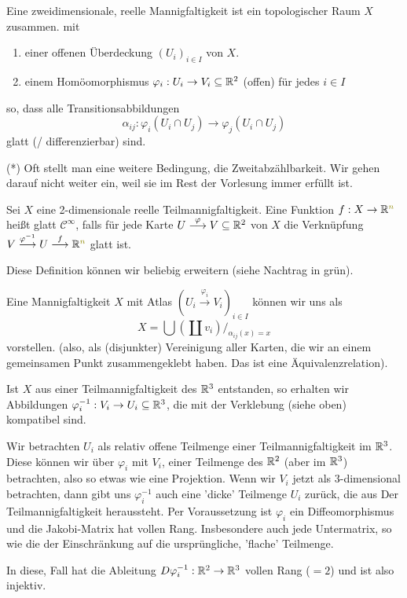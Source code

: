 \documentclass[main.tex]{subfiles}
\begin{document}
\begin{Definition}
  Eine zweidimensionale, reelle Mannigfaltigkeit ist ein topologischer Raum $X$ zusammen. mit
  \begin{enumerate}
    \item einer offenen Überdeckung $(U_i)_{i \in I}$ von $X$.
    \item einem Homöomorphismus $\varphi_i : U_i \to V_i \subseteq \mathbb{R}^2$ (offen) für jedes $i \in I$
  \end{enumerate}
  so, dass alle Transitionsabbildungen
  $$\alpha_{ij} : \varphi_i(U_i \cap U_j) \to \varphi_j(U_i \cap U_j)$$
  glatt (/ differenzierbar) sind.

  (*) Oft stellt man eine weitere Bedingung, die Zweitabzählbarkeit. Wir gehen darauf nicht weiter ein, weil sie im Rest der Vorlesung immer erfüllt ist.
\end{Definition}

\begin{Definition}
  Sei $X$ eine 2-dimensionale reelle Teilmannigfaltigkeit. Eine Funktion $f: X \to \R^{\color{olive}n}$ heißt glatt $\mathcal{C}^\infty$, falls für jede Karte $U \stackrel{\varphi}{\longrightarrow} V \subseteq \mathbb{R}^2$ von $X$ die Verknüpfung $V \stackrel{\varphi^{-1}}{\longrightarrow} U \stackrel{f}{\longrightarrow} \R^{\color{olive}n}$ glatt ist.

  Diese Definition können wir beliebig erweitern (siehe Nachtrag in grün).
\end{Definition}

Eine Mannigfaltigkeit $X$ mit Atlas $(U_i \stackrel{\varphi_i}{\longrightarrow} V_i)_{i \in I}$ können wir uns als
$$X = \bigcup \left(\coprod v_i \right) /_{\alpha_{ij}(x) = x}$$
vorstellen. (also, als (disjunkter) Vereinigung aller Karten, die wir an einem gemeinsamen Punkt zusammengeklebt haben. Das ist eine Äquivalenzrelation).

Ist $X$ aus einer Teilmannigfaltigkeit des $\mathbb{R}^3$ entstanden, so erhalten wir Abbildungen $\varphi_i^{-1}: V_i \to U_i \subseteq \mathbb{R}^3$, die mit der Verklebung (siehe oben) kompatibel sind.

\begin{Bemerkung}[(salopp)]
  Wir betrachten $U_i$ als relativ offene Teilmenge einer Teilmannigfaltigkeit im $\mathbb{R}^3$. Diese können wir über $\varphi_i$ mit $V_i$, einer Teilmenge des $\mathbb{R}^2$ (aber im $\mathbb{R}^3$) betrachten, also so etwas wie eine Projektion. Wenn wir $V_i$ jetzt als 3-dimensional betrachten, dann gibt uns $\varphi_i^{-1}$ auch eine 'dicke' Teilmenge $U_i$ zurück, die aus Der Teilmannigfaltigkeit heraussteht. Per Voraussetzung ist $\varphi_i$ ein Diffeomorphismus und die Jakobi-Matrix hat vollen Rang. Insbesondere auch jede Untermatrix, so wie die der Einschränkung auf die ursprüngliche, 'flache' Teilmenge.

  In diese, Fall hat die Ableitung $D\varphi_i^{-1}: \mathbb{R}^2 \to \mathbb{R}^3$ vollen Rang ($=2$) und ist also injektiv.
\end{Bemerkung}
\end{document}
